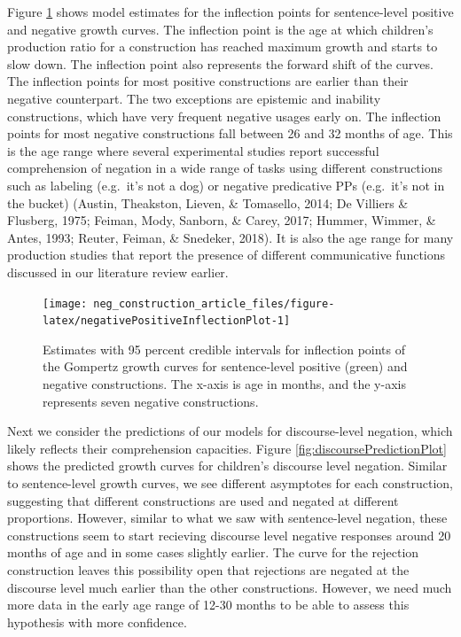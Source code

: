 \documentclass[
  man,floatsintext]{apa6}
\begin{document}
Figure \ref{fig:negativePositiveInflectionPlot} shows model estimates for the inflection points for sentence-level positive and negative growth curves. The inflection point is the age at which children's production ratio for a construction has reached maximum growth and starts to slow down. The inflection point also represents the forward shift of the curves. The inflection points for most positive constructions are earlier than their negative counterpart. The two exceptions are epistemic and inability constructions, which have very frequent negative usages early on. The inflection points for most negative constructions fall between 26 and 32 months of age. This is the age range where several experimental studies report successful comprehension of negation in a wide range of tasks using different constructions such as labeling (e.g.~it's not a dog) or negative predicative PPs (e.g.~it's not in the bucket) (Austin, Theakston, Lieven, \& Tomasello, 2014; De Villiers \& Flusberg, 1975; Feiman, Mody, Sanborn, \& Carey, 2017; Hummer, Wimmer, \& Antes, 1993; Reuter, Feiman, \& Snedeker, 2018). It is also the age range for many production studies that report the presence of different communicative functions discussed in our literature review earlier.

\begin{figure}[H]

{\centering \texttt{[image: neg\_construction\_article\_files/figure-latex/negativePositiveInflectionPlot-1]} 

}

\caption{Estimates with 95 percent credible intervals for inflection points of the Gompertz growth curves for sentence-level positive (green) and negative constructions. The x-axis is age in months, and the y-axis represents seven negative constructions.}\label{fig:negativePositiveInflectionPlot}
\end{figure}

Next we consider the predictions of our models for discourse-level negation, which likely reflects their comprehension capacities. Figure \ref{fig:discoursePredictionPlot} shows the predicted growth curves for children's discourse level negation. Similar to sentence-level growth curves, we see different asymptotes for each construction, suggesting that different constructions are used and negated at different proportions. However, similar to what we saw with sentence-level negation, these constructions seem to start recieving discourse level negative responses around 20 months of age and in some cases slightly earlier. The curve for the rejection construction leaves this possibility open that rejections are negated at the discourse level much earlier than the other constructions. However, we need much more data in the early age range of 12-30 months to be able to assess this hypothesis with more confidence.
\end{document}
